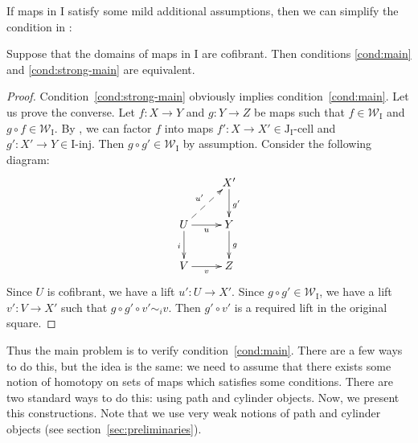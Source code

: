 \documentclass{tac}
\theoremstyle{definition}
\newcommand{\we}{\mathcal{W}}
\newcommand{\I}{\mathrm{I}}
\newcommand{\J}{\mathrm{J}}
\newcommand{\class}[2]{#1\text{-}\mathrm{#2}}
\newcommand{\Iinj}[1][\I]{\class{#1}{inj}}
\newcommand{\Icell}[1][\I]{\class{#1}{cell}}
\newcommand{\Jcell}[1][]{\Icell[\J#1]}
\begin{document}
If maps in $\I$ satisfy some mild additional assumptions, then we can simplify the condition in :
\begin{prop}[main]
Suppose that the domains of maps in $\I$ are cofibrant.
Then conditions \eqref{cond:main} and \eqref{cond:strong-main} are equivalent.
\end{prop}
\begin{proof}
Condition~\eqref{cond:strong-main} obviously implies condition~\eqref{cond:main}.
Let us prove the converse.
Let $f : X \to Y$ and $g : Y \to Z$ be maps such that $f \in \we_\I$ and $g \circ f \in \we_\I$.
By , we can factor $f$ into maps $f' : X \to X' \in \Jcell[_\I]$ and $g' : X' \to Y \in \Iinj$.
Then $g \circ g' \in \we_\I$ by assumption.
Consider the following diagram:
\[ \xymatrix{ & X' \ar[d]^{g'} \\
              U \ar[r]_u \ar[d]_i \ar@{-->}[ur]^{u'} & Y \ar[d]^g \\
              V \ar[r]_v & Z
            } \]
Since $U$ is cofibrant, we have a lift $u' : U \to X'$.
Since $g \circ g' \in \we_\I$, we have a lift $v' : V \to X'$ such that $g \circ g' \circ v' \sim_i v$.
Then $g' \circ v'$ is a required lift in the original square.
\end{proof}

Thus the main problem is to verify condition~\eqref{cond:main}.
There are a few ways to do this, but the idea is the same:
we need to assume that there exists some notion of homotopy on sets of maps which satisfies some conditions.
There are two standard ways to do this: using path and cylinder objects.
Now, we present this constructions.
Note that we use very weak notions of path and cylinder objects (see section~\ref{sec:preliminaries}).
\end{document}

